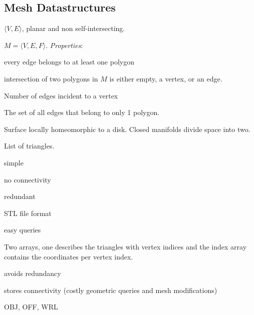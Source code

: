 \subsection{Mesh Datastructures}

\begin{definition}[Polygon]
  \(\langle V, E\rangle\), planar and non self-intersecting.
\end{definition}

\begin{definition}
  \(M = \langle V, E, F\rangle\).
  \textit{Properties}:
  \begin{itemize*}
    \item every edge belongs to at least one polygon
    \item intersection of two polygons in \(M\) is either empty, a vertex, or an edge.
  \end{itemize*}
\end{definition}

\begin{definition}[Valence]
  Number of edges incident to a vertex
\end{definition}

\begin{definition}[Boundary]
  The set of all edges that belong to only 1 polygon.
\end{definition}

\begin{definition}[Manifold]
  Surface locally homeomorphic to a disk. Closed manifolds divide space into two.
\end{definition}

\begin{definition}
  List of triangles.
  \begin{itemize*}
    \item simple
    \item no connectivity
    \item redundant
    \item STL file format
    \item easy queries
  \end{itemize*}
\end{definition}

\begin{definition}
  Two arrays, one describes the triangles with vertex indices and the index array contains the coordinates per vertex index.
  \begin{itemize*}
    \item avoids redundancy
    \item stores connectivity (costly geometric queries and mesh modifications)
    \item OBJ, OFF, WRL
  \end{itemize*}
\end{definition}

